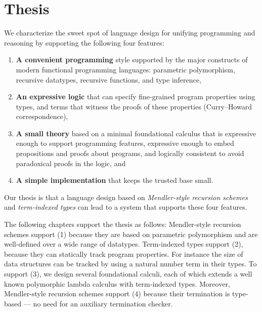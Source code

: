 \section{Thesis}\label{sec:intro:thesis}
We characterize the sweet spot of language design for unifying programming
and reasoning by supporting the following four features:
\begin{enumerate}[(1)]
 \item \textbf{A convenient programming} style
         supported by the major constructs of
         modern functional programming languages: 
         parametric polymorphism, recursive datatypes,
         recursive functions, and type inference,

 \item \textbf{An expressive logic} that can specify
         fine-grained program properties using types,
         and terms that witness the proofs of these properties 
         (Curry--Howard correspondence),

 \item \textbf{A small theory} based on a minimal foundational calculus
         that is expressive enough to support programming features,
         expressive enough to embed propositions and proofs about programs,
         and logically consistent to avoid paradoxical proofs in the logic, and

 \item \textbf{A simple implementation} that keeps the trusted base small.
\end{enumerate}
Our thesis is
that a language design based on \emph{Mendler-style recursion schemes}
and \emph{term-indexed types} can lead to a system that supports these four
features.

The following chapters support the thesis as follows:
Mendler-style recursion schemes support (1) because they are based on
parametric polymorphism and are well-defined over a wide range of datatypes.
Term-indexed types support (2), because they can statically track
program properties. For instance the size of data structures can
be tracked by using a natural number term in their types.
To support (3), we design several foundational calculi, each of which extends
a well known polymorphic lambda calculus with term-indexed types.
Moreover, Mendler-style recursion schemes support (4) because their
termination is type-based --- no need for an auxiliary termination checker.

